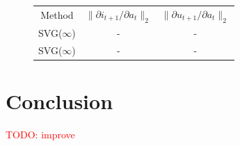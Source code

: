 \documentclass{article} %
\begin{document}
\begin{figure}[t!]
    \centering
  \begin{tabular}{|ccc|}
    \hline
    Method & $\| \partial i_{t+1} / \partial a_t \|_2$ & $\| \partial u_{t+1} / \partial {a_t} \|_2$\\
    \hhline{|===|}
    SVG($\infty$) & - & - \\
    SVG($\infty$) & - & - \\
    \hline
  \end{tabular}
\end{figure}








  \section{Conclusion}

  \textcolor{red}{TODO: improve}
  
\end{document}

